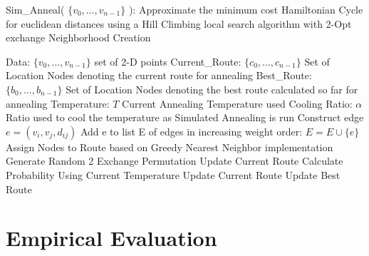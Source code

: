 \documentclass[format=sigconf]{acmart}
\begin{document}
\begin{algorithm}
	\caption{  Sim\_Anneal( $\{v_0, \hdots, v_{n-1}\}$ ): Approximate the minimum cost Hamiltonian Cycle for euclidean distances using a Hill Climbing local search algorithm with 2-Opt exchange Neighborhood Creation}
	\begin{algorithmic} 
		\STATE Data: $\{v_0, \hdots, v_{n-1}\}$ set of 2-D points
		\STATE Current\_Route: $\{c_0, \hdots, c_{n-1}\}$ Set of Location Nodes denoting the current route for annealing
		\STATE Best\_Route: $\{b_0, \hdots, b_{n-1}\}$ Set of Location Nodes denoting the best route calculated so far for annealing
		\STATE Temperature: $T$ Current Annealing Temperature used
		\STATE Cooling Ratio: $\alpha$ Ratio used to cool the temperature as Simulated Annealing is run
			\STATE Construct edge $e = (v_i, v_j, d_{ij})$
			\STATE Add e to list E of edges in increasing weight order: $E = E \cup \{e\}$
		\ENDFOR
			\STATE Assign Nodes to Route based on Greedy Nearest Neighbor implementation
		\ENDWHILE
			\STATE Generate Random 2 Exchange Permutation
				\STATE Update Current Route
			\ELSE
				\STATE Calculate Probability Using Current Temperature
					\STATE Update Current Route
				\ENDIF
			\ENDIF
				\STATE Update Best Route
			\ENDIF
		\ENDWHILE
	\end{algorithmic}
\end{algorithm}
\section*{Empirical Evaluation}
\end{document}
